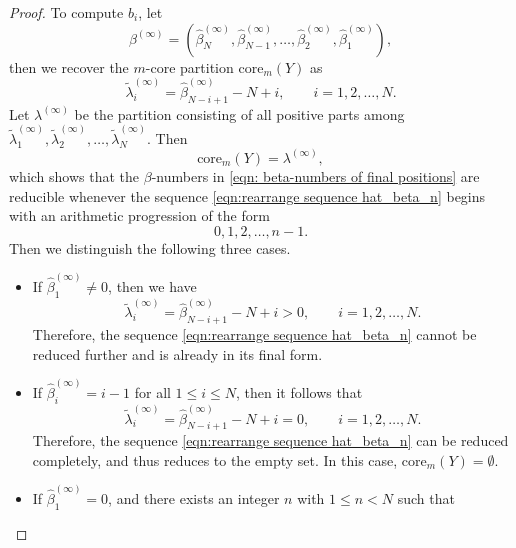 \documentclass[preprint,3p,10pt]{elsarticle}
\theoremstyle{definition}
\begin{document}
\begin{proof}
To compute \(b_i\), let
\begin{equation}\label{eqn: beta-numbers of final positions}
\beta^{(\infty)}=
\left(\widehat{\beta}^{(\infty)}_N,\widehat{\beta}^{(\infty)}_{N-1},\ldots,\widehat{\beta}^{(\infty)}_2,\widehat{\beta}^{(\infty)}_1
\right),
\end{equation}
then we recover the $m$-core partition \(\mathrm{core}_m(Y)\) as
\begin{equation}\label{eq:standard-recover-core-lemma}
    \tilde{\lambda}^{(\infty)}_i
    =
    \widehat{\beta}^{(\infty)}_{N-i+1}-N+i,
    \qquad i=1,2,\ldots,N.
\end{equation}
Let \(\lambda^{(\infty)}\) be the partition consisting of all positive parts among
\(\tilde{\lambda}^{(\infty)}_1,\tilde{\lambda}^{(\infty)}_2,\ldots,\tilde{\lambda}^{(\infty)}_N\). Then
\begin{equation}
    \mathrm{core}_m(Y)=\lambda^{(\infty)},
\end{equation}
which shows that the \(\beta\)-numbers in \eqref{eqn: beta-numbers of final positions} are reducible whenever the sequence \eqref{eqn:rearrange sequence hat_beta_n} begins with an arithmetic progression of the form
\begin{equation}
0,1,2,\ldots,n-1.
\end{equation}
Then we distinguish the following three cases.
\begin{itemize}
    \item If \(\widehat{\beta}^{(\infty)}_1 \neq 0\), then we have
    \begin{equation}
        \tilde{\lambda}^{(\infty)}_i
        =
        \widehat{\beta}^{(\infty)}_{N-i+1}-N+i>0,
        \qquad i=1,2,\ldots,N.
    \end{equation}
    Therefore, the sequence \eqref{eqn:rearrange sequence hat_beta_n} cannot be reduced further and is already in its final form.
    \item If \(\widehat{\beta}^{(\infty)}_i=i-1\) for all \(1\le i\le N\), then
     it follows that
    \begin{equation}
            \tilde{\lambda}^{(\infty)}_i
            =
            \widehat{\beta}^{(\infty)}_{N-i+1}-N+i=0,
            \qquad i=1,2,\ldots,N.
        \end{equation}
    Therefore, the sequence \eqref{eqn:rearrange sequence hat_beta_n} can be reduced completely, and thus reduces to the empty set. In this case, $\mathrm{core}_m(Y)=\emptyset$.
    \item If \(\widehat{\beta}^{(\infty)}_1=0\), and there exists an integer \(n\) with \(1\le n < N\) such that

\end{itemize}
\end{proof}
\end{document}
